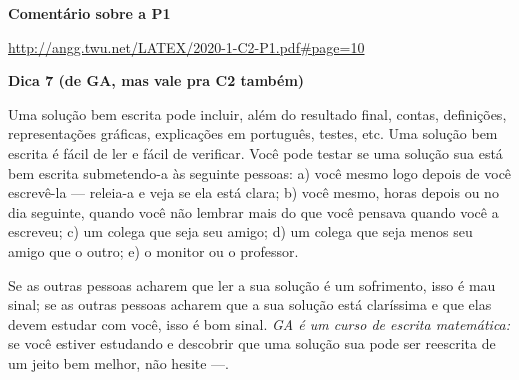 \documentclass[oneside,12pt]{article}
\begin{document}
{\bf Comentário sobre a P1}


{\footnotesize

\url{http://angg.twu.net/LATEX/2020-1-C2-P1.pdf#page=10}

}

\newpage

%                            

\vspace*{-1.0cm}

{\bf Dica 7 (de GA, mas vale pra C2 também)}

Uma solução bem escrita pode incluir, além do resultado final, contas,
definições, representações gráficas, explicações em português, testes,
etc. Uma solução bem escrita é fácil de ler e fácil de verificar. Você
pode testar se uma solução sua está bem escrita submetendo-a às
seguinte pessoas: a) você mesmo logo depois de você escrevê-la ---
releia-a e veja se ela está clara; b) você mesmo, horas depois ou no
dia seguinte, quando você não lembrar mais do que você pensava quando
você a escreveu; c) um colega que seja seu amigo; d) um colega que
seja menos seu amigo que o outro; e) o monitor ou o professor.

Se as outras pessoas acharem que ler a sua solução é um sofrimento,
isso é mau sinal; se as outras pessoas acharem que a sua solução está
claríssima e que elas devem estudar com você, isso é bom sinal. {\sl
  GA é um curso de escrita matemática:} se você estiver estudando e
descobrir que uma solução sua pode ser reescrita de um jeito bem
melhor, não hesite ---.












\end{document}
